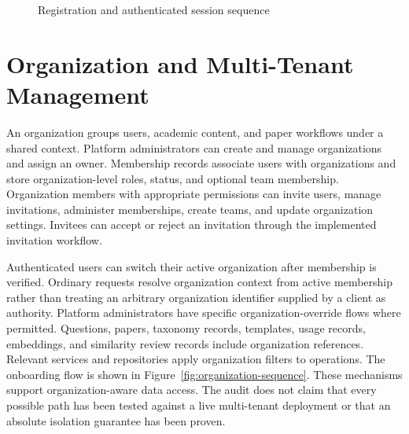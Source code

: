 \begin{figure}[H]
    \centering
    \caption{Registration and authenticated session sequence}
    \label{fig:ch3-seq-auth}
\end{figure}

\section{Organization and Multi-Tenant Management}

An organization groups users, academic content, and paper workflows under a shared context. Platform administrators can create and manage organizations and assign an owner. Membership records associate users with organizations and store organization-level roles, status, and optional team membership. Organization members with appropriate permissions can invite users, manage invitations, administer memberships, create teams, and update organization settings. Invitees can accept or reject an invitation through the implemented invitation workflow.

Authenticated users can switch their active organization after membership is verified. Ordinary requests resolve organization context from active membership rather than treating an arbitrary organization identifier supplied by a client as authority. Platform administrators have specific organization-override flows where permitted. Questions, papers, taxonomy records, templates, usage records, embeddings, and similarity review records include organization references. Relevant services and repositories apply organization filters to operations. The onboarding flow is shown in Figure~\ref{fig:organization-sequence}. These mechanisms support organization-aware data access. The audit does not claim that every possible path has been tested against a live multi-tenant deployment or that an absolute isolation guarantee has been proven.

